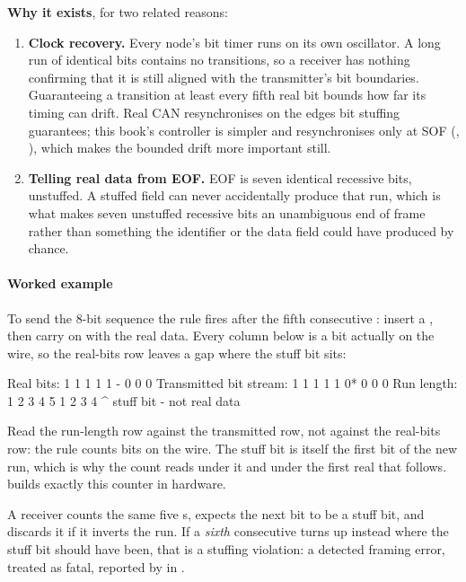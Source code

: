 \textbf{Why it exists}, for two related reasons:
\begin{enumerate}
  \item \textbf{Clock recovery.} Every node's bit timer runs on its own oscillator. A long run of
    identical bits contains no transitions, so a receiver has nothing confirming that it is still
    aligned with the transmitter's bit boundaries. Guaranteeing a transition at least every fifth
    real bit bounds how far its timing can drift. Real CAN resynchronises on the edges bit stuffing
    guarantees; this book's controller is simpler and resynchronises only at SOF
    (, ), which makes the bounded drift more important still.
  \item \textbf{Telling real data from EOF.} EOF is seven identical recessive bits, unstuffed. A
    stuffed field can never accidentally produce that run, which is what makes seven unstuffed
    recessive bits an unambiguous end of frame rather than something the identifier or the data field
    could have produced by chance.
\end{enumerate}

\paragraph{Worked example}
To send the 8-bit sequence  the rule fires after the fifth consecutive :
insert a , then carry on with the real data. Every column below is a bit actually on the
wire, so the real-bits row leaves a gap where the stuff bit sits:

\begin{textdrawing}
Real bits:                1  1  1  1  1  -  0  0  0
Transmitted bit stream:   1  1  1  1  1  0* 0  0  0
Run length:               1  2  3  4  5  1  2  3  4
                                         ^ stuff bit - not real data
\end{textdrawing}

Read the run-length row against the transmitted row, not against the real-bits row: the rule counts
bits on the wire. The stuff bit is itself the first bit of the new run, which is why the count reads
 under it and  under the first real  that follows.  builds
exactly this counter in hardware.

A receiver counts the same five s, expects the next bit to be a stuff bit, and discards it if
it inverts the run. If a \emph{sixth} consecutive  turns up instead where the stuff bit
should have been, that is a stuffing violation: a detected framing error, treated as fatal, reported
by  in .


